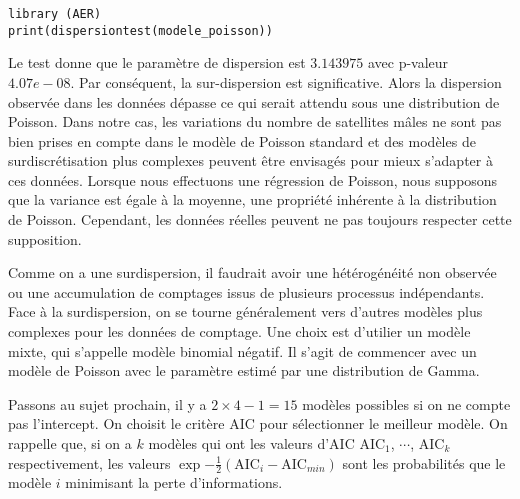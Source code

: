 \documentclass[../main.tex]{subfiles}
\begin{document}
\begin{CJK*}{UTF8}{gbsn}
\begin{lstlisting}
library (AER)
print(dispersiontest(modele_poisson))
\end{lstlisting}

Le test donne que le paramètre de dispersion est $3.143975$ avec p-valeur $4.07e-08$.
Par conséquent, la sur-dispersion est significative.
Alors la dispersion observée dans les données 
dépasse ce qui serait attendu sous une distribution de Poisson. 
Dans notre cas, les variations du nombre de satellites mâles ne sont pas 
bien prises en compte dans le modèle de Poisson standard et 
des modèles de surdiscrétisation plus complexes peuvent être envisagés pour mieux s'adapter à ces données.
Lorsque nous effectuons une régression de Poisson, nous supposons que la variance est égale à la moyenne, 
une propriété inhérente à la distribution de Poisson. 
Cependant, les données réelles peuvent ne pas toujours respecter cette supposition. 

Comme on a une surdispersion, il faudrait avoir 
une hétérogénéité non observée ou une accumulation de comptages issus de plusieurs processus indépendants.
Face à la surdispersion, 
on se tourne généralement vers d'autres modèles plus complexes pour les données de comptage. 
Une choix est d'utilier un modèle mixte, qui s'appelle modèle binomial négatif. 
Il s'agit de commencer avec un modèle de Poisson
avec le paramètre estimé par une distribution de Gamma.

Passons au sujet prochain, il y a $2 \times 4-1=15$ modèles possibles si on ne compte pas l'intercept.
On choisit le critère AIC pour sélectionner le meilleur modèle.
On rappelle que, si on a $k$ modèles qui ont les valeurs d'AIC $\text{AIC}_1$, $\cdots$, $\text{AIC}_k$ respectivement,
les valeurs $\exp{-\frac{1}{2}(\text{AIC}_i - \text{AIC}_{min})}$ sont les probabilités que le modèle $i$
minimisant la perte d'informations.


\end{CJK*}
\end{document}
